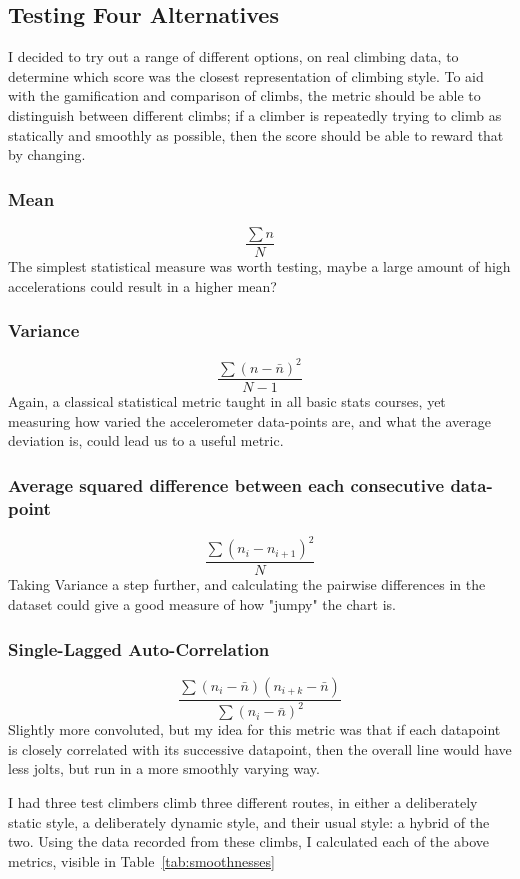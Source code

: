 \subsection{Testing Four Alternatives}
I decided to try out a range of different options, on real climbing data, to determine which score was the closest representation of climbing style.
To aid with the gamification and comparison of climbs, the metric should be able to distinguish between different climbs; if a climber is repeatedly trying to climb as statically and smoothly as possible, then the score should be able to reward that by changing.

\subsubsection{Mean}
$$\frac{\sum n }{N}$$
The simplest statistical measure was worth testing, maybe a large amount of high accelerations could result in a higher mean?

\subsubsection{Variance}
$$\frac{\sum (n - \bar{n} )^2 }{N-1}$$
Again, a classical statistical metric taught in all basic stats courses, yet measuring how varied the accelerometer data-points are, and what the average deviation is, could lead us to a useful metric.

\subsubsection{Average squared difference between each consecutive data-point}
$$\frac{\sum (n_i - n_{i+1} )^2 }{N}$$
Taking Variance a step further, and calculating the pairwise differences in the dataset could give a good measure of how "jumpy" the chart is.

\subsubsection{Single-Lagged Auto-Correlation}
$$
\frac{\sum(n_{i} - \bar{n})(n_{i+k} - \bar{n})}
      {\sum(n_{i} - \bar{n})^{2} }
$$
Slightly more convoluted, but my idea for this metric was that if each datapoint is closely correlated with its successive datapoint, then the overall line would have less jolts, but run in a more smoothly varying way.


I had three test climbers climb three different routes, in either a deliberately static style, a deliberately dynamic style, and their usual style: a hybrid of the two.
Using the data recorded from these climbs, I calculated each of the above metrics, visible in Table~\ref{tab:smoothnesses}

